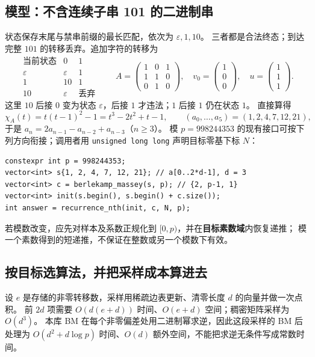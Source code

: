 \subsection{模型：不含连续子串 101 的二进制串}
状态保存末尾与禁串前缀的最长匹配，依次为 $\varepsilon,1,10$。
三者都是合法终态；到达完整 $101$ 的转移丢弃。追加字符的转移为
\[
\begin{array}{c|cc}
\text{当前状态}&0&1\\\hline
\varepsilon&\varepsilon&1\\
1&10&1\\
10&\varepsilon&\text{丢弃}
\end{array}
\qquad
A=\begin{pmatrix}1&0&1\\1&1&0\\0&1&0\end{pmatrix},\quad
v_0=\begin{pmatrix}1\\0\\0\end{pmatrix},\quad
u=\begin{pmatrix}1\\1\\1\end{pmatrix}.
\]
这里 $10$ 后接 $0$ 变为状态 $\varepsilon$，后接 $1$ 才违法；$1$ 后接 $1$ 仍在状态 $1$。
直接算得
\[
\chi_A(t)=t(t-1)^2-1=t^3-2t^2+t-1,\qquad
(a_0,\ldots,a_5)=(1,2,4,7,12,21),
\]
于是 $a_n=2a_{n-1}-a_{n-2}+a_{n-3}$（$n\ge3$）。
模 $p=998244353$ 的现有接口可按下列方向衔接；调用者用 \texttt{unsigned long long} 声明目标零基下标 $N$：
\begin{lstlisting}
constexpr int p = 998244353;
vector<int> s{1, 2, 4, 7, 12, 21}; // a[0..2*d-1], d = 3
vector<int> c = berlekamp_massey(s, p); // {2, p-1, 1}
vector<int> init(s.begin(), s.begin() + c.size());
int answer = recurrence_nth(init, c, N, p);
\end{lstlisting}
若模数改变，应先对样本及系数正规化到 $[0,p)$，并在\textbf{目标素数域}内恢复递推；
模一个素数得到的短递推，不保证在整数或另一个模数下有效。

\subsection{按目标选算法，并把采样成本算进去}
设 $e$ 是存储的非零转移数，采样用稀疏边表更新、清零长度 $d$ 的向量并做一次点积。
前 $2d$ 项需要 $O(d(e+d))$ 时间、$O(e+d)$ 空间；稠密矩阵采样为 $O(d^3)$。
本库 BM 在每个非零偏差处用二进制幂求逆，因此这段采样的 BM 后处理为
$O(d^2+d\log p)$ 时间、$O(d)$ 额外空间，不能把求逆无条件写成常数时间。

